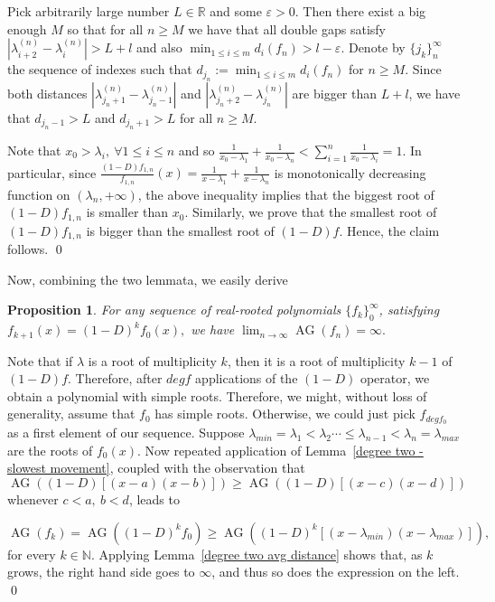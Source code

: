 \documentclass[11pt]{article}
\DeclareMathOperator{\AG}{AG}
\newtheorem{proposition}[theorem]{Proposition}
\begin{document}
Pick arbitrarily large number $L\in\mathbb{R}$ and some $\varepsilon > 0$. Then there exist a big enough $M$ so that for all $n\geq M$ we have that all double gaps satisfy $|\lambda^{(n)}_{i+2} - \lambda^{(n)}_i| > L + l$ and also $\min_{1\leq i \leq m} d_i (f_n)> l - \varepsilon$. Denote by $\{j_k\}_{n}^{\infty}$ the sequence of indexes such that $d_{j_n}:=\min_{1\leq i \leq m} d_i (f_n)$ for $n\geq M$. Since both distances $|\lambda^{(n)}_{j_n+1} - \lambda^{(n)}_{j_n-1}|$ and $|\lambda^{(n)}_{j_n+2} - \lambda^{(n)}_{j_n}|$ are bigger than $L + l$, we have that $d_{j_n-1}> L$ and $d_{j_n+1} > L$ for all $n\geq M$.

Note that $x_0 > \lambda_i,~\forall 1\leq i \leq n$ and so $\frac{1}{x_0 - \lambda_1} + \frac{1}{x_0 - \lambda_n} < \sum_{i=1}^n \frac{1}{x_0 - \lambda_i} = 1.$ In particular, since $\frac{(1-D)f_{1,n}}{f_{1,n}}(x) = \frac{1}{x - \lambda_1} + \frac{1}{x - \lambda_n}$ is monotonically decreasing function on $(\lambda_n, +\infty)$, the above inequality implies that the biggest root of $(1-D)f_{1,n}$ is smaller than $x_0$. Similarly, we prove that the smallest root of $(1-D)f_{1,n}$ is bigger than the smallest root of $(1-D)f$. Hence, the claim follows. \qed

Now, combining the two lemmata, we easily derive

\begin{proposition}For any sequence of real-rooted polynomials $\{f_k\}_0^{\infty}$, satisfying $f_{k+1}(x) = (1-D)^k f_{0}(x),$ we have $\lim_{n\to \infty} \AG(f_n) =  \infty.$
\end{proposition}
\label{avg gap goes to infty}
\proof Note that if $\lambda$ is a root of multiplicity $k$, then it is a root of multiplicity $k-1$ of $(1-D)f$. Therefore, after $deg f$ applications of the $(1-D)$ operator, we obtain a polynomial with simple roots. Therefore, we might, without loss of generality, assume that $f_0$ has simple roots. Otherwise, we could just pick $f_{deg f_0}$ as a first element of our sequence. Suppose $\lambda_{min}=\lambda_1 < \lambda_2 \cdots \leq \lambda_{n-1} < \lambda_n = \lambda_{max}$ are the roots of $f_0(x)$. Now repeated application of Lemma~\ref{degree two - slowest movement}, coupled with the observation that $\AG((1-D)[(x-a)(x-b)]) \geq \AG((1-D)[(x-c)(x-d)])$ whenever $c < a,~b<d$, leads to

\[\AG(f_k)= \AG((1-D)^kf_0)\geq\AG((1-D)^k [(x-\lambda_{min})(x-\lambda_{max})]),\]
for every $k\in\mathbb{N}$. Applying Lemma~\ref{degree two avg distance} shows that, as $k$ grows, the right hand side goes to $\infty$, and thus so does the expression on the left. \qed
\end{document}
